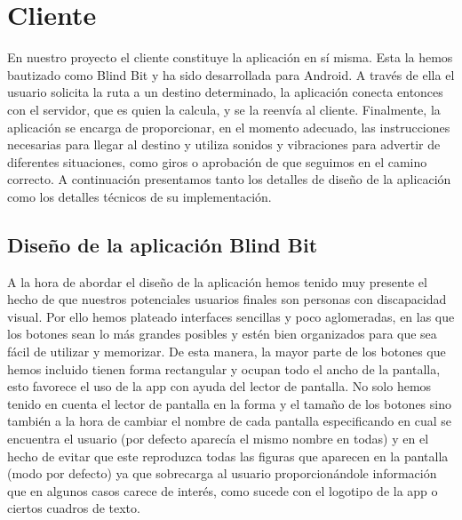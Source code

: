 


\section{Cliente}

En nuestro proyecto el cliente constituye la aplicación en sí misma. Esta la hemos bautizado como Blind Bit y ha sido desarrollada para Android. A través de ella el usuario solicita la ruta a un destino determinado, la aplicación conecta entonces con el servidor, que es quien la calcula, y se la reenvía al cliente. Finalmente, la aplicación se encarga de proporcionar, en el momento adecuado, las instrucciones necesarias para llegar al destino y utiliza sonidos y vibraciones para advertir de diferentes situaciones, como giros o aprobación de que seguimos en el camino correcto. A continuación presentamos tanto los detalles de diseño de la aplicación como los detalles técnicos de su implementación. 


\subsection{Diseño de la aplicación Blind Bit}
\label{sub:diseño}

A la hora de abordar el diseño de la aplicación hemos tenido muy presente el hecho de que nuestros potenciales usuarios finales son personas con discapacidad visual. Por ello hemos plateado interfaces sencillas y poco aglomeradas, en las que los botones sean lo más grandes posibles y estén bien organizados para que sea fácil de utilizar y memorizar. De esta manera, la mayor parte de los botones que hemos incluido tienen forma rectangular y ocupan todo el ancho de la pantalla, esto favorece el uso de la app con ayuda del lector de pantalla. No solo hemos tenido en cuenta el lector de pantalla en la forma y el tamaño de los botones sino también a la hora de cambiar el nombre de cada pantalla especificando en cual se encuentra el usuario (por defecto aparecía el mismo nombre en todas) y en el hecho de evitar que este reproduzca todas las figuras que aparecen en la pantalla (modo por defecto) ya que sobrecarga al usuario proporcionándole información que en algunos casos carece de interés, como sucede con el logotipo de la app o ciertos cuadros de texto.

